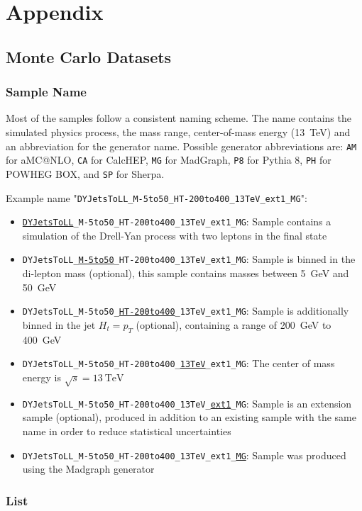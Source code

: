 

\renewcommand\thechapter{A}
\chapter{Appendix}

\section{Monte Carlo Datasets}
\label{sec:appendix_mc_datasets}

\subsection{Sample Name}
Most of the samples follow a consistent naming scheme. The name contains the simulated physics process, the mass range, center-of-mass energy (\SI{13}{\TeV}) and an abbreviation for the generator name.
Possible generator abbreviations are: \texttt{AM} for aMC@NLO, \texttt{CA} for CalcHEP, \texttt{MG} for MadGraph, \texttt{P8} for Pythia 8, \texttt{PH} for POWHEG BOX, and \texttt{SP} for Sherpa.

Example name "\texttt{DYJetsToLL\_M-5to50\_HT-200to400\_13TeV\_ext1\_MG}":
\begin{itemize}
\item \texttt{\underline{DYJetsToLL}\_M-5to50\_HT-200to400\_13TeV\_ext1\_MG}: Sample contains a simulation of the Drell-Yan process with two leptons in the final state
\item \texttt{DYJetsToLL\_\underline{M-5to50}\_HT-200to400\_13TeV\_ext1\_MG}: Sample is binned in the di-lepton mass (optional), this sample contains masses between \SI{5}{\GeV} and \SI{50}{\GeV}
\item \texttt{DYJetsToLL\_M-5to50\_\underline{HT-200to400}\_13TeV\_ext1\_MG}: Sample is additionally binned in the jet $H_t = p_T$ (optional), containing a range of \SI{200}{\GeV} to \SI{400}{\GeV}
\item \texttt{DYJetsToLL\_M-5to50\_HT-200to400\_\underline{13TeV}\_ext1\_MG}: The center of mass energy is $\sqrt{s} = \SI{13}{\TeV}$
\item \texttt{DYJetsToLL\_M-5to50\_HT-200to400\_13TeV\_\underline{ext1}\_MG}:
 Sample is an extension sample (optional), produced in addition to an existing sample with the same name in order to reduce statistical uncertainties
\item \texttt{DYJetsToLL\_M-5to50\_HT-200to400\_13TeV\_ext1\_\underline{MG}}:
 Sample was produced using the Madgraph generator
\end{itemize}

\pagebreak
\subsection{List}
{
    \small
    \def\arraystretch{1}
    
}
